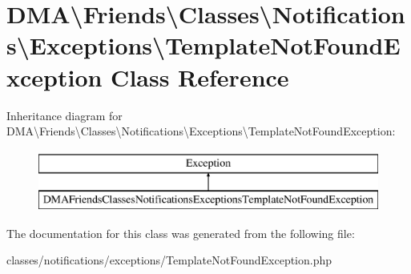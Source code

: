 \hypertarget{classDMA_1_1Friends_1_1Classes_1_1Notifications_1_1Exceptions_1_1TemplateNotFoundException}{}\section{D\+M\+A\textbackslash{}Friends\textbackslash{}Classes\textbackslash{}Notifications\textbackslash{}Exceptions\textbackslash{}Template\+Not\+Found\+Exception Class Reference}
\label{classDMA_1_1Friends_1_1Classes_1_1Notifications_1_1Exceptions_1_1TemplateNotFoundException}
Inheritance diagram for D\+M\+A\textbackslash{}Friends\textbackslash{}Classes\textbackslash{}Notifications\textbackslash{}Exceptions\textbackslash{}Template\+Not\+Found\+Exception\+:\begin{figure}[H]
\begin{center}
\leavevmode
\includegraphics[height=2.000000cm]{d6/dc3/classDMA_1_1Friends_1_1Classes_1_1Notifications_1_1Exceptions_1_1TemplateNotFoundException}
\end{center}
\end{figure}


The documentation for this class was generated from the following file\+:\begin{DoxyCompactItemize}
\item 
classes/notifications/exceptions/Template\+Not\+Found\+Exception.\+php\end{DoxyCompactItemize}
